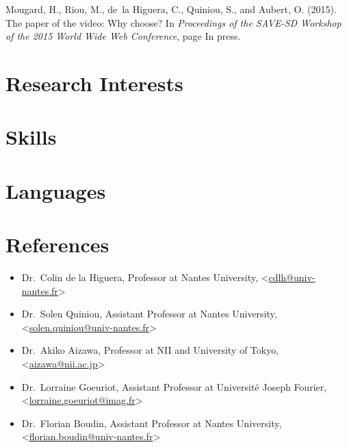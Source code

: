 \documentclass[11pt,a4paper,sans]{moderncv}        %
\begin{document}
\nocite{*}

\begin{thebibliography}{}

Mougard, H., Riou, M., de~la Higuera, C., Quiniou, S., and Aubert, O. (2015).
\newblock The paper of the video: Why choose?
\newblock In {\em Proceedings of the SAVE-SD Workshop of the 2015 World Wide
  Web Conference}, page In press.

\end{thebibliography}

\section{Research Interests}

\section{Skills}


\section{Languages}

\section{References}
\begin{itemize}
\item Dr.~Colin de la Higuera, Professor at Nantes University,
  <\href{mailto:cdlh@univ-nantes.fr}{cdlh@univ-nantes.fr}>
\item Dr.~Solen Quiniou, Assistant Professor at Nantes University,
  <\href{mailto:solen.quiniou@univ-nantes.fr}{solen.quiniou@univ-nantes.fr}>
\item Dr.~Akiko Aizawa, Professor at NII and University of Tokyo,
  <\href{mailto:aizawa@nii.ac.jp}{aizawa@nii.ac.jp}>
\item Dr.~Lorraine Goeuriot, Assistant Professor at Université Joseph
  Fourier,
  <\href{mailto:lorraine.goeuriot@imag.fr}{lorraine.goeuriot@imag.fr}>
\item Dr.~Florian Boudin, Assistant Professor at Nantes University,
  <\href{mailto:florian.boudin@univ-nantes.fr}{florian.boudin@univ-nantes.fr}>
\end{itemize}
\end{document}
